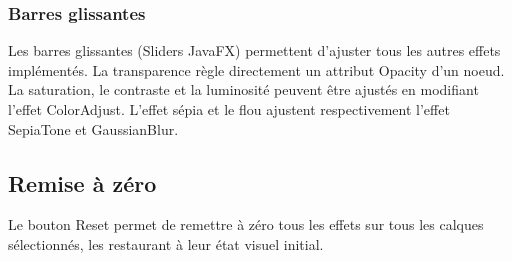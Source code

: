 \subsubsection{Barres glissantes}
Les barres glissantes (\og Sliders \fg{} JavaFX) permettent d'ajuster tous les autres effets implémentés. La transparence règle directement un attribut \og Opacity \fg{} d'un noeud. La saturation, le contraste et la luminosité peuvent être ajustés en modifiant l'effet ColorAdjust. L'effet sépia et le flou ajustent respectivement l'effet SepiaTone et GaussianBlur.

\subsection{Remise à zéro}
Le bouton \og Reset \fg{} permet de remettre à zéro tous les effets sur tous les calques sélectionnés, les restaurant à leur état visuel initial.



